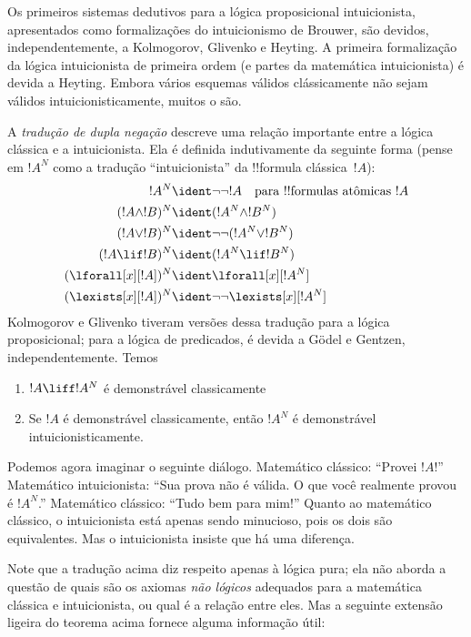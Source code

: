 \documentclass[../../../include/open-logic-section]{subfiles}
\begin{document}
Os primeiros sistemas dedutivos para a lógica proposicional
intuicionista, apresentados como formalizações do intuicionismo de
Brouwer, são devidos, independentemente, a Kolmogorov, Glivenko e
Heyting. A primeira formalização da lógica intuicionista de primeira
ordem (e partes da matemática intuicionista) é devida a Heyting. Embora
vários esquemas válidos clássicamente não sejam válidos
intuicionisticamente, muitos o são.

A \emph{tradução de dupla negação} descreve uma relação importante
entre a lógica clássica e a intuicionista. Ela é definida
indutivamente da seguinte forma (pense em $!A^N$ como a tradução
``intuicionista'' da !!{formula} clássica~$!A$):
\begin{align*}
!A^N & \ident \lnot\lnot !A \quad \text{para !!{formula}s atômicas $!A$} \\
(!A \land !B)^N & \ident (!A^N \land !B^N) \\
(!A \lor !B)^N & \ident  \lnot\lnot (!A^N \lor !B^N) \\
(!A \lif !B)^N & \ident (!A^N \lif !B^N) \\
(\lforall[x][!A])^N & \ident \lforall[x][!A^N] \\
(\lexists[x][!A])^N & \ident \lnot\lnot\lexists[x][!A^N]
\end{align*}
Kolmogorov e Glivenko tiveram versões dessa tradução para a lógica
proposicional; para a lógica de predicados, é devida a G\"odel e
Gentzen, independentemente. Temos

\begin{thm}
\begin{enumerate}
\item $!A \liff !A^N$ é demonstrável classicamente
\item Se $!A$ é demonstrável classicamente, então $!A^N$ é demonstrável
  intuicionisticamente.
\end{enumerate}
\end{thm}

Podemos agora imaginar o seguinte diálogo. Matemático clássico:
``Provei $!A$!'' Matemático intuicionista: ``Sua prova não é
válida. O que você realmente provou é $!A^N$.'' Matemático clássico:
``Tudo bem para mim!'' Quanto ao matemático clássico, o intuicionista
está apenas sendo minucioso, pois os dois são equivalentes. Mas o
intuicionista insiste que há uma diferença.

Note que a tradução acima diz respeito apenas à lógica pura; ela não
aborda a questão de quais são os axiomas \emph{não lógicos} adequados
para a matemática clássica e intuicionista, ou qual é a relação entre
eles. Mas a seguinte extensão ligeira do teorema acima fornece alguma
informação útil:
\end{document}
